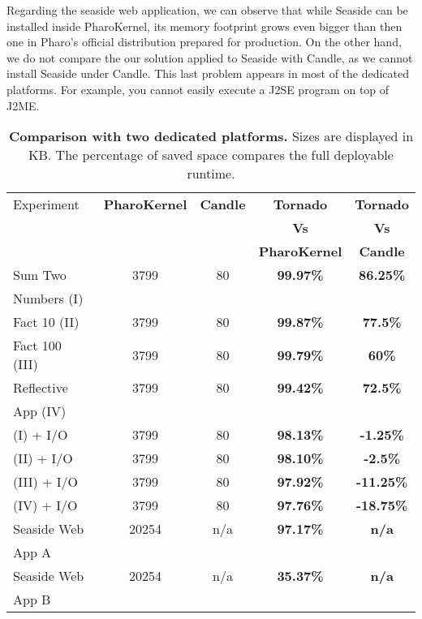 Regarding the seaside web application, we can observe that while Seaside can be installed inside PharoKernel, its memory footprint grows even bigger than then one in Pharo's official distribution prepared for production. On the other hand, we do not compare the our solution applied to Seaside with Candle, as we cannot install Seaside under Candle. This last problem appears in most of the dedicated platforms. For example, you cannot easily execute a J2SE program on top of J2ME. 

\begin{table}[ht]
 	\centering
 	\begin{tabular}{lcccc}
		\toprule
			Experiment
 			& \textbf{PharoKernel}
			& \textbf{Candle}
			& \textbf{Tornado}
			& \textbf{Tornado}\\
			
 			& 
			& 
			& \textbf{Vs}
			& \textbf{Vs}\\
			
 			& 
			& 
			& \textbf{PharoKernel}
			& \textbf{Candle}\\
		\toprule
		Sum Two
 			&  3799 & 80 & \textbf{99.97\%} & \textbf{86.25\%}\\
		Numbers (I)
 			& &&&\\
		\midrule
		Fact 10 (II)
 			& 3799 & 80 & \textbf{99.87\%} & \textbf{77.5\%}\\
		\midrule
		Fact 100 (III)
 			& 3799 & 80 & \textbf{99.79\%} & \textbf{60\%}\\
		\midrule
		Reflective
 			& 3799 & 80 & \textbf{99.42\%} & \textbf{72.5\%}\\
		App (IV)&&&&\\
		\midrule
		(I) + I/O
 			& 3799 & 80 & \textbf{98.13\%} & \textbf{-1.25\%}\\
		\midrule
		(II) + I/O
 			& 3799 & 80 & \textbf{98.10\%} & \textbf{-2.5\%}\\
		\midrule
		(III) + I/O
 			& 3799 & 80 & \textbf{97.92\%} & \textbf{-11.25\%}\\
		\midrule
		(IV) + I/O
 			& 3799 & 80 & \textbf{97.76\%} & \textbf{-18.75\%}\\
		\midrule
		Seaside Web
 			& 20254 & n/a & \textbf{97.17\%}  & \textbf{n/a}\\
		App A&&&&\\
		\midrule
		Seaside Web
 			& 20254 & n/a & \textbf{35.37\%}  & \textbf{n/a}\\
		App B&&&&\\
		\bottomrule
 	\end{tabular}
 	\caption{\textbf{Comparison with two dedicated platforms.} Sizes are displayed in KB. The percentage of saved space compares the full deployable runtime.}
 	\label{tb:results_dedicated}
 \end{table}

